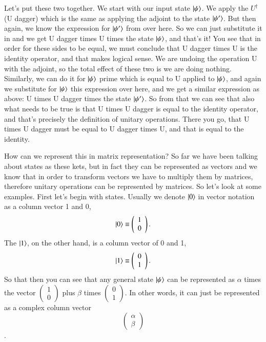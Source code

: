 Let's put these two together. We start with our input state $\left| \psi \right\rangle$. We apply the $U^\dagger$ (U dagger) which is the same as applying the adjoint to the state $\left| \psi' \right\rangle$. But then again, we know the expression for $\left| \psi' \right\rangle$ from over here. So we can just substitute it in and we get U dagger times U times the state $\left| \psi \right\rangle$, and that's it! You see that in order for these sides to be equal, we must conclude that U dagger times U is the identity operator, and that makes logical sense. We are undoing the operation U with the adjoint, so the total effect of these two is we are doing nothing. Similarly, we can do it for $\left| \psi \right\rangle$ prime which is equal to U applied to $\left| \psi \right\rangle$, and again we substitute for $\left| \psi \right\rangle$ this expression over here, and we get a similar expression as above: U times U dagger times the state $\left| \psi' \right\rangle$. So from that we can see that also what needs to be true is that U times U dagger is equal to the identity operator, and that's precisely the definition of unitary operations. There you go, that U times U dagger must be equal to U dagger times U, and that is equal to the identity. 

How can we represent this in matrix representation? So far we have been talking about states as these kets, but in fact they can be represented as vectors and we know that in order to transform vectors we have to multiply them by matrices, therefore unitary operations can be represented by matrices. So let's look at some examples. First let's begin with states. Usually we denote $\left| 0 \right\rangle$ in vector notation as a column vector 1 and 0,
\begin{equation}
\left| 0 \right\rangle\equiv\left(\begin{array}{l}
1 \\
0
\end{array}\right).
\end{equation}
The $\left| 1 \right\rangle$, on the other hand, is a column vector of 0 and 1,
\begin{equation}
\left| 1 \right\rangle\equiv\left(\begin{array}{l}
0 \\
1
\end{array}\right).
\end{equation}
So that then you can see that any general state $\left| \psi \right\rangle$ can be represented as $\alpha$ times the vector $\left(\begin{array}{l}
1 \\
0
\end{array}\right)$ plus $\beta$ times $\left(\begin{array}{l}
0 \\
1
\end{array}\right)$. In other words, it can just be represented as a complex column vector $$\left(\begin{array}{l}
\alpha \\
\beta
\end{array}\right)$$.

